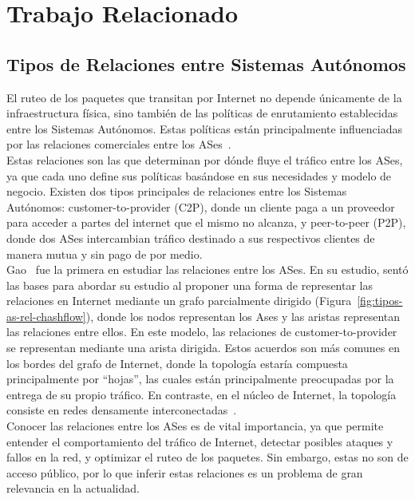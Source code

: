 ﻿\chapter{Trabajo Relacionado}


\section{Tipos de Relaciones entre Sistemas Autónomos}

El ruteo de los paquetes que transitan por Internet no depende únicamente de la infraestructura física, sino también de las políticas de enrutamiento establecidas entre los Sistemas Autónomos.  Estas políticas están  principalmente influenciadas por las relaciones comerciales entre los ASes~\cite{computing-observed-autonomous-system-relationships-in-the-internet}.\\

Estas relaciones son las que determinan por dónde fluye el tráfico entre los ASes, ya que cada uno define sus políticas basándose en sus necesidades y modelo de negocio. Existen dos tipos principales de relaciones entre los Sistemas Autónomos: customer-to-provider (C2P), donde un cliente paga a un proveedor para acceder a partes del internet que el mismo no alcanza, y peer-to-peer (P2P), donde dos ASes intercambian tráfico destinado a sus respectivos clientes de manera mutua y sin pago de por medio.\\


Gao~\cite{InferringASRelatioships2001} fue la primera en estudiar las relaciones entre los ASes. En su estudio, sentó las bases para abordar su estudio al proponer una forma de representar las relaciones en Internet mediante un grafo parcialmente dirigido (Figura~\ref{fig:tipos-as-rel-chashflow}), donde los nodos representan los Ases y las aristas representan las relaciones entre ellos. En este modelo, las relaciones de customer-to-provider se representan mediante una arista dirigida. Estos acuerdos son más comunes en los bordes del grafo de Internet, donde la topología estaría compuesta  principalmente por ``hojas'', las cuales están principalmente preocupadas por la entrega de su propio tráfico. En contraste, en el núcleo de Internet, la topología consiste en redes densamente interconectadas~\cite{SurveyInterconnectionAgreements}.\\



Conocer las relaciones entre los ASes es de vital importancia, ya que permite entender el comportamiento del tráfico de Internet, detectar posibles ataques y fallos en la red, y optimizar el ruteo de los paquetes. Sin embargo, estas no son de acceso público, por lo que inferir estas relaciones es un problema de gran relevancia en la actualidad. 

